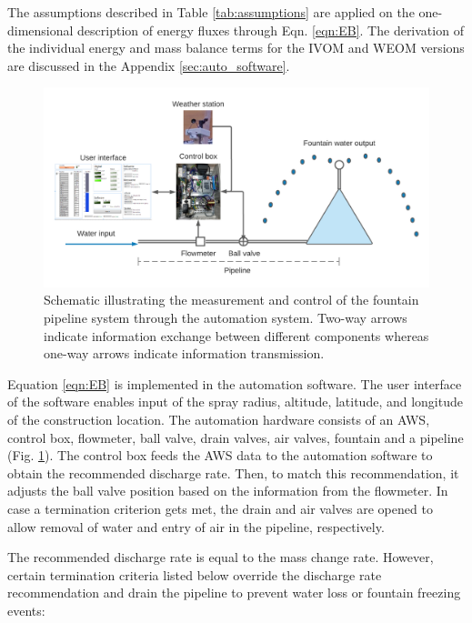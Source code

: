The assumptions described in Table \ref{tab:assumptions} are applied on the one-dimensional description of
energy fluxes through Eqn. \ref{eqn:EB}. The derivation of the individual energy and mass balance terms for the
\ac{IVOM} and \ac{WEOM} versions are discussed in the Appendix \ref{sec:auto_software}.

\begin{figure}
\includegraphics[width=\linewidth]{figs/Automation_schematic.png}
\caption{Schematic illustrating the measurement and control of the fountain pipeline system through the
  automation system. Two-way arrows indicate information exchange between different components whereas one-way
  arrows indicate information transmission.}

\label{fig:auto_schematic} 
\end{figure}

Equation \ref{eqn:EB} is implemented in the automation software. The user interface of the software enables
input of the spray radius, altitude, latitude, and longitude of the construction location. The automation
hardware consists of an \ac{AWS}, control box, flowmeter, ball valve, drain valves, air valves, fountain and a
pipeline (Fig. \ref{fig:auto_schematic}). The control box feeds the AWS data to the automation software to
obtain the recommended discharge rate. Then, to match this recommendation, it adjusts the ball valve position
based on the information from the flowmeter. In case a termination criterion gets met, the drain and air valves
are opened to allow removal of water and entry of air in the pipeline, respectively.

The recommended discharge rate is equal to the mass change rate. However, certain termination criteria listed
below override the discharge rate recommendation and drain the pipeline to prevent water loss or fountain
freezing events:

